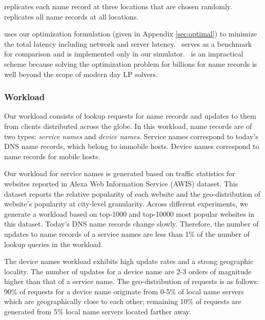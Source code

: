 \textbf{\staticthree} replicates each name record at three locations that are chosen randomly. \textbf{\replicateall} replicates all name records at all locations. 

\textbf{\opt} uses our optimization formulation (given in Appendix \ref{sec:optimal}) to minimize the total latency including network and server latency.  \opt\ serves as a benchmark for comparison and is implemented only in our simulator. \opt\ is an impractical scheme because solving the optimization problem for billions for name records is well beyond the scope of modern day LP solvers.




\subsubsection{Workload}

Our workload consists of lookup requests for name records and updates to them from clients distributed across the globe. In this workload, name records are of two types: \emph{service names} and \emph{device names}. Service names correspond to today's DNS name records, which belong to immobile hosts. Device names correspond to name records for mobile hosts.

Our workload for service names is generated based on traffic statistics for websites reported in Alexa Web Information Service \cite{alexa} (AWIS) dataset. This dataset reports the relative popularity of each website and the geo-distribution of website's popularity at city-level granularity. 
Across different experiments, we generate a workload based on top-1000 and top-10000 most popular websites in this dataset. Today's DNS name records change slowly. Therefore, the number of updates to name records of a service names are less than 1\% of the number of lookup queries in the workload.


The device names workload exhibits high update rates and a strong geographic locality. The number of updates for a device name are 2-3 orders of magnitude higher than that of a service name. The geo-distribution of requests is as follows: 90\% of requests for a device name originate from 0-5\% of local name servers which are geographically close to each other; remaining 10\% of requests are generated from 5\% local name servers located farther away.

